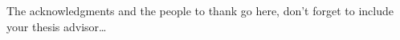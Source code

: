 
\begin{acknowledgements}

\addchaptertocentry{\acknowledgementname}

The acknowledgments and the people to thank go here, don't forget to include your thesis advisor\ldots

\lipsum[1-6]

\end{acknowledgements}
